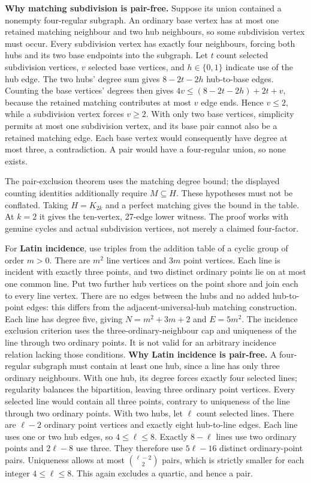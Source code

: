\documentclass[smallextended]{svjour3}
\newcounter{none} %
\begin{document}
\textbf{Why matching subdivision is pair-free.} Suppose its union
contained a nonempty four-regular subgraph. An ordinary base vertex has
at most one retained matching neighbour and two hub neighbours, so some
subdivision vertex must occur. Every subdivision vertex has exactly four
neighbours, forcing both hubs and its two base endpoints into the
subgraph. Let \(t\) count selected subdivision vertices, \(v\) selected
base vertices, and \(h\in\{0,1\}\) indicate use of the hub edge. The two
hubs' degree sum gives \(8-2t-2h\) hub-to-base edges. Counting the base
vertices' degrees then gives \(4v\le(8-2t-2h)+2t+v\), because the
retained matching contributes at most \(v\) edge ends. Hence \(v\le2\),
while a subdivision vertex forces \(v\ge2\). With only two base
vertices, simplicity permits at most one subdivision vertex, and its
base pair cannot also be a retained matching edge. Each base vertex
would consequently have degree at most three, a contradiction. A pair
would have a four-regular union, so none exists.

The pair-exclusion theorem uses the matching degree bound; the displayed
counting identities additionally require \(M\subseteq H\). These
hypotheses must not be conflated. Taking \(H=K_{2k}\) and a perfect
matching gives the bound in the table. At \(k=2\) it gives the
ten-vertex, 27-edge lower witness. The proof works with genuine cycles
and actual subdivision vertices, not merely a claimed four-factor.

For \textbf{Latin incidence}, use triples from the addition table of a
cyclic group of order \(m>0\). There are \(m^2\) line vertices and
\(3m\) point vertices. Each line is incident with exactly three points,
and two distinct ordinary points lie on at most one common line. Put two
further hub vertices on the point shore and join each to every line
vertex. There are no edges between the hubs and no added hub-to-point
edges: this differs from the adjacent-universal-hub matching
construction. Each line has degree five, giving \(N=m^2+3m+2\) and
\(E=5m^2\). The incidence exclusion criterion uses the
three-ordinary-neighbour cap and uniqueness of the line through two
ordinary points. It is not valid for an arbitrary incidence relation
lacking those conditions. \textbf{Why Latin incidence is pair-free.} A
four-regular subgraph must contain at least one hub, since a line has
only three ordinary neighbours. With one hub, its degree forces exactly
four selected lines; regularity balances the bipartition, leaving three
ordinary point vertices. Every selected line would contain all three
points, contrary to uniqueness of the line through two ordinary points.
With two hubs, let \(\ell\) count selected lines. There are \(\ell-2\)
ordinary point vertices and exactly eight hub-to-line edges. Each line
uses one or two hub edges, so \(4\le\ell\le8\). Exactly \(8-\ell\) lines
use two ordinary points and \(2\ell-8\) use three. They therefore use
\(5\ell-16\) distinct ordinary-point pairs. Uniqueness allows at most
\(\binom{\ell-2}{2}\) pairs, which is strictly smaller for each integer
\(4\le\ell\le8\). This again excludes a quartic, and hence a pair.
\end{document}
